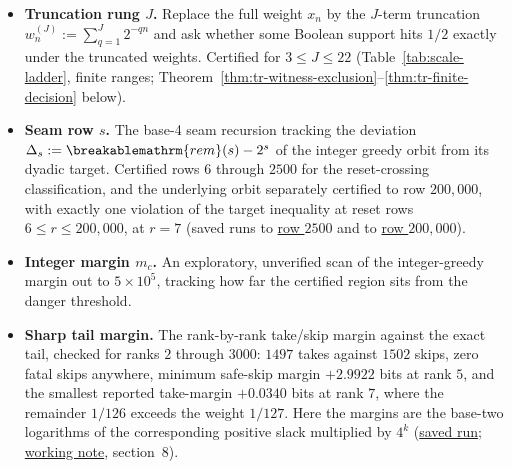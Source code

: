 \documentclass[11pt]{article}
\theoremstyle{plain}
\theoremstyle{definition}
\theoremstyle{remark}
\renewcommand{\mathrm}[1]{\ifmmode\breakablemathrm{#1}\else\textrm{#1}\fi}%
\begin{document}
\begin{itemize}
\item \textbf{Truncation rung $J$.} Replace the full weight $x_n$ by the $J$-term truncation
$w_n^{(J)}:=\sum_{q=1}^{J}2^{-qn}$ and ask whether some Boolean support hits $1/2$ exactly under
the truncated weights. Certified for $3\le J\le22$ (Table~\ref{tab:scale-ladder}, finite ranges;
Theorem~\ref{thm:tr-witness-exclusion}--\ref{thm:tr-finite-decision} below).
\item \textbf{Seam row $s$.} The base-4 seam recursion tracking the deviation $\Delta_s:=\mathrm{rem}(s)-2^s$
of the integer greedy orbit from its dyadic target. Certified rows $6$ through $2500$ for the
reset-crossing classification, and the underlying orbit separately certified to row
$200{,}000$, with exactly one violation of the target inequality at reset rows $6\le r\le200{,}000$, at $r=7$
(saved runs to
\href{https://github.com/wcook04/plectis-erdos/blob/f757115e03bebe5c04431a147da559015c680a37/research/experiments/erdos257/receipts/seam-reset-crossing-2500.json}{row $2500$}
and to
\href{https://github.com/wcook04/plectis-erdos/blob/f757115e03bebe5c04431a147da559015c680a37/research/experiments/erdos257/receipts/seam-orbit-200000.json}{row $200{,}000$}).
\item \textbf{Integer margin $m_c$.} An exploratory, unverified scan of the integer-greedy
margin out to $5\times10^5$, tracking how far the certified region sits from the danger
threshold.
\item \textbf{Sharp tail margin.} The rank-by-rank take/skip margin against the exact tail, checked
for ranks $2$ through $3000$: $1497$ takes against $1502$ skips, zero fatal skips anywhere, minimum
safe-skip margin $+2.9922$ bits at rank $5$, and the smallest
reported take-margin $+0.0340$ bits at rank $7$, where the remainder
$1/126$ exceeds the weight $1/127$.  Here the margins are the base-two
logarithms of the corresponding positive slack multiplied by $4^k$
(\href{https://github.com/wcook04/plectis-erdos/blob/f757115e03bebe5c04431a147da559015c680a37/research/experiments/erdos257/receipts/tail-margins-3000.json}{saved run};
\href{https://github.com/wcook04/plectis-erdos/blob/f757115e03bebe5c04431a147da559015c680a37/research/experiments/erdos257/notes/reset-crossing-unification-2026-07-24.md}{working note},
section~8).
\end{itemize}
\end{document}
